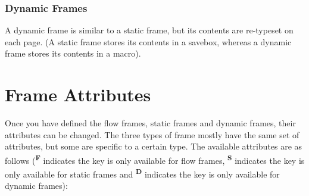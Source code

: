 \documentclass[a4paper]{article}
\begin{document}
\subsubsection{Dynamic Frames}

A dynamic frame is similar to a static frame, but its contents
are re-typeset on each page. (A static frame stores its 
contents in a savebox, whereas a dynamic frame stores its
contents in a macro).

\section{Frame Attributes}
\label{sec:modattr}

Once you have defined the {flow frames}, {static frames} and 
{dynamic frames}, their attributes can be changed. 
The three types of frame mostly have the 
same set of attributes, but some are specific to a certain type.
The available attributes are as follows
(\textsuperscript{\textbf{F}} indicates the key is
only available for {flow frames}, 
\textsuperscript{\textbf{S}} indicates the key is only available 
for {static frames}
and \textsuperscript{\textbf{D}} indicates the key
is only available for {dynamic frames}):
\end{document}
